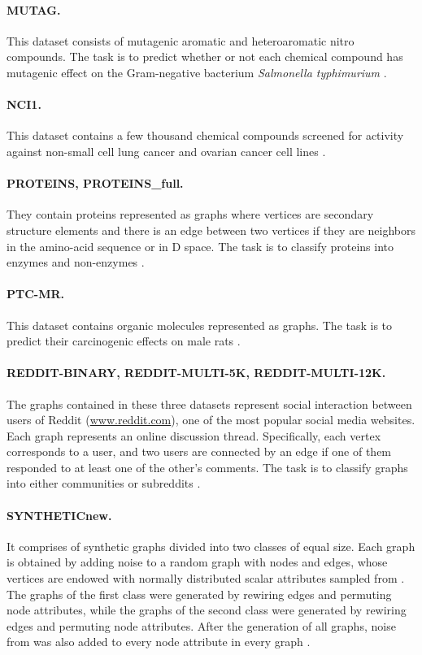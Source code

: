 \documentclass[twoside,11pt]{article}
\begin{document}
\paragraph{MUTAG.} This dataset consists of  mutagenic aromatic and heteroaromatic nitro compounds.
The task is to predict whether or not each chemical compound has mutagenic effect on the Gram-negative bacterium {\it Salmonella typhimurium} \cite{debnath1991structure}.
\paragraph{NCI1.} This dataset contains a few thousand chemical compounds screened for activity against non-small cell lung cancer and ovarian cancer cell lines \cite{wale2008comparison}.
\paragraph{PROTEINS, PROTEINS\_full.} They contain proteins represented as graphs where vertices are secondary structure elements and there is an edge between two vertices if they are neighbors in the amino-acid sequence or in D space.
The task is to classify proteins into enzymes and non-enzymes \cite{borgwardt2005protein}. 
\paragraph{PTC-MR.} This dataset contains  organic molecules represented as graphs.
The task is to predict their carcinogenic effects on male rats \cite{toivonen2003statistical}. 
\paragraph{REDDIT-BINARY, REDDIT-MULTI-5K, REDDIT-MULTI-12K.} The graphs contained in these three datasets represent social interaction between users of Reddit (\url{www.reddit.com}), one of the most popular social media websites.
Each graph represents an online discussion thread.
Specifically, each vertex corresponds to a user, and two users are connected by an edge if one of them responded to at least one of the other's comments.
The task is to classify graphs into either communities or subreddits \cite{yanardag2015deep}.
\paragraph{SYNTHETICnew.} It comprises of  synthetic graphs divided into two classes of equal size.
Each graph is obtained by adding noise to a random graph with  nodes and  edges, whose vertices are endowed with normally distributed scalar attributes sampled from .
The graphs of the first class were generated by rewiring  edges and permuting  node attributes, while the graphs of the second class were generated by rewiring  edges and permuting  node attributes.
After the generation of all graphs, noise from  was also added to every node attribute in every graph \cite{feragen2013scalable}.
\end{document}
